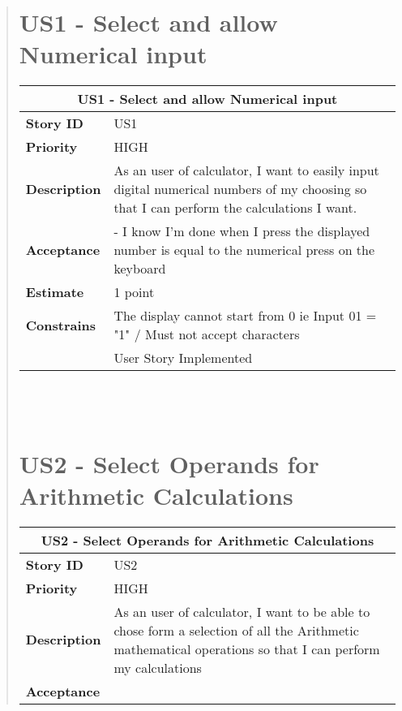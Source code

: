\documentclass[12pt]{report}
\begin{document}
\begin{quote}
                \section{US1 - Select and allow Numerical input}
                
                \begin{tabular}{ |p{4cm}|p{10cm}| }
                 \hline
                 \multicolumn{2}{|c|}{\textbf{US1 - Select and allow Numerical input}} \\
                 \hline
                 \textbf {Story ID}& US1  \\
                 \hline
                 \textbf{Priority} & HIGH \\
                 \hline
                 \textbf{Description}   & As an user of calculator, I want to easily input digital numerical numbers of my choosing so that I can perform the calculations I want.  \\
                 \hline
                 \textbf{Acceptance}& 
                
                 - I know I'm done when I press the displayed number is equal to the numerical press on the keyboard
                
                \\
                 \hline
                 \textbf{Estimate} &  1  point  \\
                 \hline
                 \textbf{Constrains}& The display cannot start from 0 ie Input 01 = "1" / Must not accept characters  \\
                \hline
                
                  \hline
                 \textbf {}&User Story Implemented \\
                \hline
                \end{tabular}
            \hfill\break\\\\
                
        
        
        
        
        \section{US2 - Select Operands for Arithmetic Calculations}
                \begin{tabular}{ |p{4cm}|p{10cm}| }
                 \hline
                 \multicolumn{2}{|c|}{\textbf{US2 - Select Operands for Arithmetic Calculations}} \\
                 \hline
                 \textbf {Story ID}& US2  \\
                 \hline
                 \textbf{Priority} & HIGH \\
                 \hline
                 \textbf{Description}   &  As an user of calculator, I want to be able to chose form a selection of all the Arithmetic mathematical operations so that I can perform my calculations   \\
                 \hline
                 \textbf{Acceptance}& 
                

\end{tabular}
\end{quote}
\end{document}
